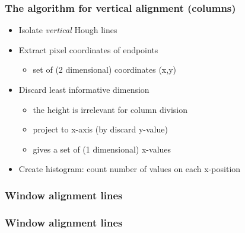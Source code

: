 \documentclass{beamer}
\begin{document}
\frame
{
	\frametitle{The algorithm for vertical alignment (columns)}
	\begin{itemize}
	\item <+-| alert@+> Isolate \emph{vertical} Hough lines
	\item <+-| alert@+> Extract pixel coordinates of endpoints 
		\begin{itemize}
		\item <+-| alert@+> set of (2 dimensional) coordinates (x,y)
		\end{itemize}
	\item <+-| alert@+> Discard least informative dimension
		\begin{itemize}
		\item <+-| alert@+> the height is irrelevant for column division
		\item <+-| alert@+> project to x-axis (by discard y-value) 
		\item <+-| alert@+> gives a set of (1 dimensional) x-values 
		\end{itemize}
	\item <+-| alert@+> Create histogram: count number of values on each x-position
	\end{itemize}
}

\frame
{
	\frametitle{Window alignment lines}
}

\frame
{
	\frametitle{Window alignment lines}
}
\end{document}
